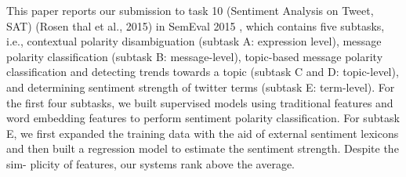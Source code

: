 This paper reports our submission to task 10 (Sentiment Analysis on Tweet, SAT) (Rosen thal et al., 2015) in SemEval 2015 , which contains five subtasks, i.e., contextual polarity disambiguation (subtask A: expression level), message polarity classification (subtask B: message-level), topic-based message polarity classification and detecting trends towards a topic (subtask C and D: topic-level), and determining sentiment strength of twitter terms (subtask E: term-level). For the first four subtasks, we built supervised models using traditional features and word embedding features to perform sentiment polarity classification. For subtask E, we first expanded the training data with the aid of external sentiment lexicons and then built a regression model to estimate the sentiment strength. Despite the sim- plicity of features, our systems rank above the average.
